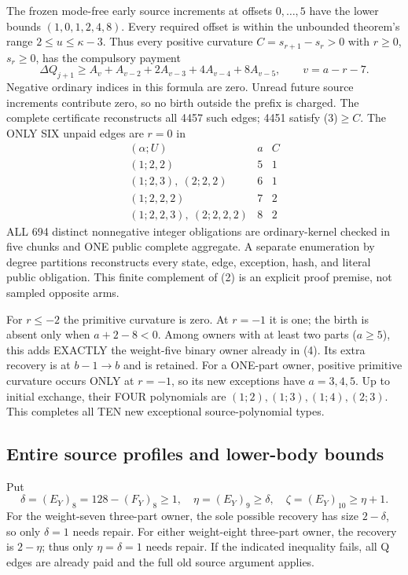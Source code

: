 The frozen mode-free early source increments at offsets $0,\ldots,5$
have the lower bounds $(1,0,1,2,4,8)$. Every required offset is within
the unbounded theorem's range $2\le u\le\kappa-3$. Thus every positive
curvature $C=s_{r+1}-s_r>0$ with $r\ge0$, $s_r\ge0$, has the
compulsory payment
\[
 \Delta Q_{j+1}\ge A_v+A_{v-2}+2A_{v-3}+4A_{v-4}+8A_{v-5},
 \qquad v=a-r-7.                                      \tag{3}
\]
Negative ordinary indices in this formula are zero. Unread future
source increments contribute zero, so no birth outside the prefix is
charged. The complete certificate reconstructs all 4457 such edges;
4451 satisfy (3)$\ge C$. The ONLY SIX unpaid edges are $r=0$ in
\[
\begin{array}{c|c|c}
 (\alpha;U)&a&C\\\hline
 (1;2,2)&5&1\\
 (1;2,3),\ (2;2,2)&6&1\\
 (1;2,2,2)&7&2\\
 (1;2,2,3),\ (2;2,2,2)&8&2
\end{array}                                                    \tag{4}
\]
ALL 694 distinct nonnegative integer obligations are ordinary-kernel
checked in five chunks and ONE public complete aggregate. A separate
enumeration by degree partitions reconstructs every state, edge,
exception, hash, and literal public obligation. This finite complement
of (2) is an explicit proof premise, not sampled opposite arms.

For $r\le-2$ the primitive curvature is zero. At $r=-1$ it is one;
the birth is absent only when $a+2-8<0$. Among owners with at least
two parts ($a\ge5$), this adds EXACTLY the weight-five binary owner
already in (4). Its extra recovery is at $b-1\to b$ and is retained.
For a ONE-part owner, positive primitive curvature occurs ONLY at
$r=-1$, so its new exceptions have $a=3,4,5$. Up to initial exchange,
their FOUR polynomials are $(1;2),(1;3),(1;4),(2;3)$.
This completes all TEN new exceptional source-polynomial types.

\subsection{Entire source profiles and lower-body bounds}
Put
\[
 \delta=(E_Y)_8=128-(F_Y)_8\ge1,\quad
 \eta=(E_Y)_9\ge\delta,\quad
 \zeta=(E_Y)_{10}\ge\eta+1.
\]
For the weight-seven three-part owner, the sole possible recovery
has size $2-\delta$, so only $\delta=1$ needs repair. For either
weight-eight three-part owner, the recovery is $2-\eta$; thus only
$\eta=\delta=1$ needs repair. If the indicated inequality fails,
all Q edges are already paid and the full old source argument applies.

